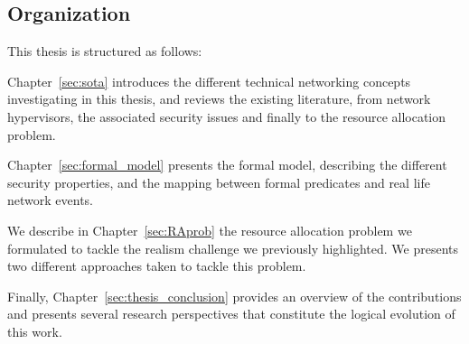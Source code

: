 
\subsection{Organization}
This thesis is structured as follows: 


Chapter~\ref{sec:sota} introduces the different technical networking concepts investigating in this thesis, and reviews the existing literature, from network hypervisors, the associated security issues and finally to the resource allocation problem. 

Chapter~\ref{sec:formal_model} presents the formal model, describing the different security properties, and the mapping between formal predicates and real life network events.

We describe in Chapter~\ref{sec:RAprob} the resource allocation problem we formulated to tackle the realism challenge we previously highlighted.
We presents two different approaches taken to tackle this problem.

Finally, Chapter~\ref{sec:thesis_conclusion} provides an overview of the contributions and presents several research perspectives that constitute the logical evolution of this work. 
